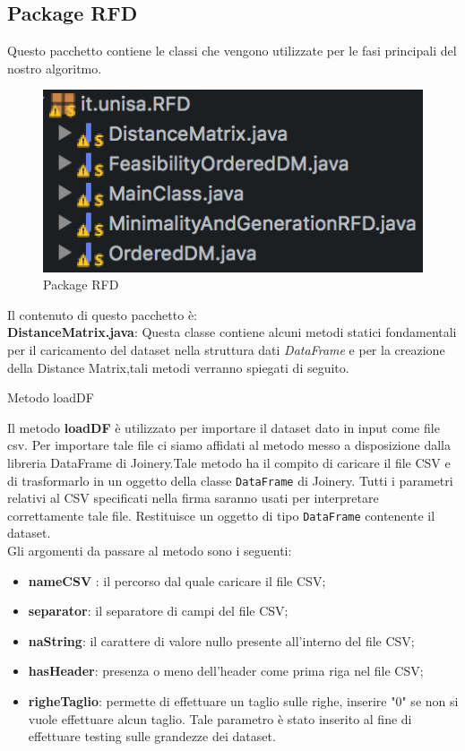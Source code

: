 \subsection{Package RFD}
Questo pacchetto contiene le classi che vengono utilizzate per le fasi principali del nostro algoritmo.\\
\begin{figure}[H]
	\centering
	\includegraphics{Immagini/PackageRFD.png}
	\caption{Package RFD}
	\label{fig:Package RFD}
\end{figure}
Il contenuto di questo pacchetto è:\\
\textbf{DistanceMatrix.java}:
Questa classe contiene alcuni metodi statici fondamentali per il caricamento del dataset nella struttura dati \emph{DataFrame} e per la creazione della Distance Matrix,tali metodi verranno spiegati di seguito.
\begin{listing}[H]
	\caption{Metodo loadDF}
	\label{Code:1}
\end{listing}
Il metodo \textbf{loadDF} è utilizzato per importare il dataset dato in input come file csv.
Per importare tale file ci siamo affidati al metodo messo a disposizione dalla libreria DataFrame di Joinery.Tale metodo ha il compito di caricare il file CSV e di trasformarlo in un oggetto della classe \texttt{DataFrame} di Joinery. Tutti i parametri relativi al CSV specificati nella firma saranno usati per interpretare correttamente tale file. Restituisce un oggetto di tipo \texttt{DataFrame} contenente il dataset. \\
Gli argomenti da passare al metodo sono i seguenti:
\begin{itemize}
	\item \textbf{nameCSV} : il percorso dal quale caricare il file CSV;
	\item \textbf{separator}:  il separatore di campi del file CSV;
	\item \textbf{naString}: il carattere di valore nullo presente all'interno del file CSV;
	\item \textbf{hasHeader}: presenza o meno dell'header come prima riga nel file CSV;
	\item \textbf{righeTaglio}: permette di effettuare un taglio sulle righe, inserire "0" se non si vuole effettuare alcun taglio.
	Tale parametro è stato inserito al fine di effettuare testing sulle grandezze dei dataset.
\end{itemize}
